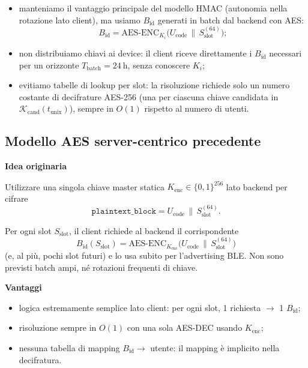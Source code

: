 \documentclass[a4paper,11pt]{article}
\begin{document}
\begin{itemize}[nosep]
  \item manteniamo il vantaggio principale del modello HMAC (autonomia nella rotazione lato
        client), ma usiamo \(B_{\text{id}}\) generati in batch dal backend con AES:
        \[
          B_{\text{id}} = \mathrm{AES\text{-}ENC}_{K_i}\bigl(U_{\text{code}} \,\|\, S_{\text{slot}}^{(64)}\bigr);
        \]
  \item non distribuiamo chiavi ai device: il client riceve direttamente i \(B_{\text{id}}\)
        necessari per un orizzonte \(T_{\text{batch}} = \SI{24}{\hour}\), senza conoscere \(K_i\);
  \item evitiamo tabelle di lookup per slot: la risoluzione richiede solo un numero costante di
        decifrature AES-256 (una per ciascuna chiave candidata in
        \(\mathcal{K}_{\mathrm{cand}}(t_{\text{unix}})\)), sempre in \(O(1)\) rispetto al numero di utenti.
\end{itemize}

\subsection{Modello AES server-centrico precedente}

\textbf{Idea originaria}

Utilizzare una singola chiave master statica \(K_{\text{enc}} \in \{0,1\}^{256}\) lato backend per
cifrare
\[
  \texttt{plaintext\_block}
  = U_{\text{code}} \,\|\, S_{\text{slot}}^{(64)}.
\]

Per ogni slot \(S_{\text{slot}}\), il client richiede al backend il corrispondente
\[
  B_{\text{id}}(S_{\text{slot}})
  = \mathrm{AES\text{-}ENC}_{K_{\text{enc}}}
  \bigl(U_{\text{code}} \,\|\, S_{\text{slot}}^{(64)}\bigr)
\]
(e, al più, pochi slot futuri) e lo usa subito per l'advertising BLE. Non sono previsti batch
ampi, né rotazioni frequenti di chiave.

\textbf{Vantaggi}

\begin{itemize}[nosep]
  \item logica estremamente semplice lato client: per ogni slot, 1 richiesta \(\to\) 1 \(B_{\text{id}}\);
  \item risoluzione sempre in \(O(1)\) con una sola AES-DEC usando \(K_{\text{enc}}\);
  \item nessuna tabella di mapping \(B_{\text{id}} \to\) utente: il mapping è implicito nella
        decifratura.
\end{itemize}
\end{document}
